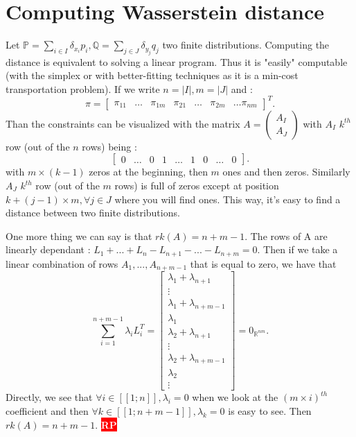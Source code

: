 \documentclass{amsart}
\newcommand{\nb}[3]{
		{\colorbox{#2}{\bfseries\sffamily\tiny\textcolor{white}{#1}}}
		{\textcolor{#2}{\text{$\blacktriangleright$}{\textcolor{#2}{#3}}\text{$\blacktriangleleft$}}}}
\newcommand{\rp}[1]{\nb{RP}{red}{#1}}
\newcommand{\RR}{\mathbb{R}}
\begin{document}
\section{Computing Wasserstein distance}
\label{compute}
Let $\mathbb{P}=\sum_{i\in I}\delta_{x_i}p_i, \mathbb{Q}=\sum_{j\in J}\delta_{y_j}q_j$ two finite distributions. Computing the distance is equivalent to solving a linear program. Thus it is "easily" computable (with the simplex or with better-fitting techniques as it is a min-cost transportation problem).
If we write $n=|I|, m=|J|$ and :
$$
\pi=\begin{bmatrix}
    \pi_{11}& \hdots&\pi_{1m}&\pi_{21}&\hdots&\pi_{2m}&\hdots\pi_{nm}
\end{bmatrix}^T.
$$
Than the constraints can be visualized with the matrix $A=\begin{pmatrix}
    A_I \\
    A_J
\end{pmatrix}$ with $A_I$ $k^{th}$ row (out of the $n$ rows) being : 
$$\begin{bmatrix}
    0&\hdots&0&1&\hdots&1&0&\hdots&0
\end{bmatrix}.$$
with $m\times(k-1)$ zeros at the beginning, then $m$ ones and then zeros. 
\newline
Similarly $A_J$ $k^{th}$ row (out of the $m$ rows) is full of zeros except at position $k+(j-1)\times m, \forall j\in J$ where you will find ones. This way, it's easy to find a distance between two finite distributions.
\newline

One more thing we can say is that $rk(A)=n+m-1$. The rows of A are linearly dependant : $L_1+...+L_n-L_{n+1}-...-L_{n+m}=0$. Then if we take a linear combination of rows $A_1,...,A_{n+m-1}$ that is equal to zero, we have that $$
\sum_{i=1}^{n+m-1}\lambda_iL_i^T=\begin{bmatrix}
    \lambda_1+\lambda_{n+1}\\ \vdots\\ \lambda_1+\lambda_{n+m-1}\\ \lambda_{1} \\ \lambda_2+\lambda_{n+1} \\ \vdots \\ \lambda_2+\lambda_{n+m-1}\\ \lambda_2  \\ \vdots
\end{bmatrix}=0_{\RR^{nm}}.
$$
Directly, we see that $\forall i \in [\![1;n]\!], \lambda_i=0$ when we look at the $(m\times i)^{th}$ coefficient and then $\forall k\in[\![1;n+m-1]\!], \lambda_k=0$ is easy to see. Then $rk(A)=n+m-1$. \rp{kind of useless as we know that the number of variables in basis is $n+m$ (number of constraints) but can be the starting point of sparsity explanation if I study regularization as Benoît mentionned}
\end{document}
